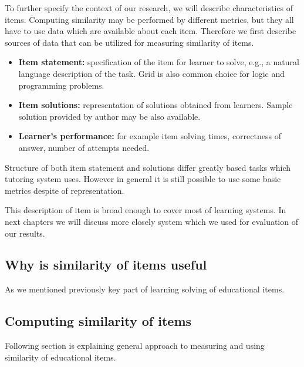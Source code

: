 \documentclass[
  digital, %
  table,   %
  nolof,     %
  nolot,     %
  nocover
]{fithesis3}
\begin{document}

To further specify the context of our research, we will describe
characteristics of items. Computing similarity may be performed by different metrics, but they all have to use data which are available about each item. Therefore we first describe
sources of data that can be utilized for measuring similarity of items.

\begin{itemize}
\item
  \textbf{Item statement:} specification of the item for learner
  to solve, e.g., a natural language description of the task. Grid is also common choice for logic and programming problems.
\item
  \textbf{Item solutions:} representation of solutions obtained from
  learners. Sample solution provided by author may be also available.
\item
  \textbf{Learner's performance:} for example item solving times,
  correctness of answer, number of attempts needed.
\end{itemize}

Structure of both item statement and solutions differ greatly based tasks which tutoring system uses. However in general it is still possible to use some basic metrics despite of representation.

This description of item is broad enough to cover most of learning
systems. In next chapters we will discuss more closely system which we used for evaluation of our results.

\subsection{Why is similarity of items useful}\label{why-is-similarity-of-items-useful}


As we mentioned previously key part of learning solving of educational
items.

\subsection{Computing similarity of
items}\label{computing-similarity-of-items}


Following section is explaining general approach to measuring and using similarity of educational
items.
\end{document}
